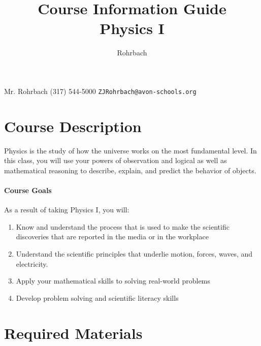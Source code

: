 \documentclass[10pt]{exam}
\title{Course Information Guide \\ Physics I}
\author{Rohrbach}
\begin{document}
\maketitle

\noindent Mr. Rohrbach
%
\hfill
%
(317) 544-5000
%
\hfill
%
\texttt{ZJRohrbach@avon-schools.org}

\vspace{-0.5em}


\section*{Course Description}

Physics is the study of how the universe works on the most fundamental level.  In this 
class, you will use your powers of observation and logical as well as mathematical 
reasoning to describe, explain, and predict the behavior of objects.

\paragraph{Course Goals} 
As a result of taking Physics I, you will:

\begin{enumerate}
	\item Know and understand the process that is used to make the scientific discoveries that 
				are reported in the media or in the workplace
	\item Understand the scientific principles that underlie motion, forces, waves, and electricity.
	\item Apply your mathematical skills to solving real-world problems
	\item Develop problem solving and scientific literacy skills
\end{enumerate}

\section*{Required Materials}
\end{document}
